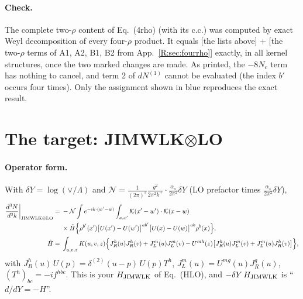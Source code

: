 \documentclass[10pt]{article}
\numberwithin{equation}{section}
\newcommand{\KK}{\mathcal K}
\newcommand{\NN}{\mathcal N}
\begin{document}
\paragraph{Check.} The complete two-$\rho$ content of Eq.~(4rho) (with its c.c.) was computed by exact Weyl decomposition of every four-$\rho$ product. It equals [the lists above] + [the two-$\rho$ terms of A1, A2, B1, B2 from App.~\ref{R:sec:fourrho}] exactly, in all kernel structures, once the two marked changes are made. As printed, the $-8N_c$ term has nothing to cancel, and term 2 of $dN^{(1)}$ cannot be evaluated (the index $b'$ occurs four times). Only the assignment shown in blue reproduces the exact result.


\section{The target: JIMWLK\texorpdfstring{$\otimes$}{x}LO}\label{T:sec:target}
\paragraph{Operator form.} With $\delta Y=\log(\vee/\Lambda)$ and $\NN=\frac{1}{(2\pi)^3}\frac{g^2}{2\pi^2k^+}\cdot\frac{\alpha_s}{2\pi^2}\delta Y$ (LO prefactor times $\frac{\alpha_s}{2\pi^2}\delta Y$),
\begin{align}
\frac{d^3N}{d^3k}\bigg|_{\rm JIMWLK\otimes LO}={}&-\NN\int e^{-ik\cdot(w'-w)}\int_{x,x'}\KK(x'-w')\cdot\KK(x-w)\notag\\
&\times\tilde H\Big\{\rho^{b'}(x')\big[U(x')-U(w')\big]^{ab'}\big[U(x)-U(w)\big]^{ab}\rho^b(x)\Big\},\notag\\
\tilde H={}&\int_{u,v,z}K(u,v,z)\Big\{J_R^h(u)J_R^h(v)+J_L^m(u)J_L^m(v)-U^{mh}(z)\big[J_R^h(u)J_L^m(v)+J_L^m(u)J_R^h(v)\big]\Big\},
\end{align}
with $J_R^h(u)\,U(p)=\delta^{(2)}(u-p)\,U(p)T^h$, $J_L^m(u)=U^{mg}(u)J_R^g(u)$, $(T^h)_{bc}=-if^{hbc}$. This is your $H_{\rm JIMWLK}$ of Eq.~(HLO), and $-\delta Y\,H_{\rm JIMWLK}$ is ``$d/dY=-H$''.
\end{document}
